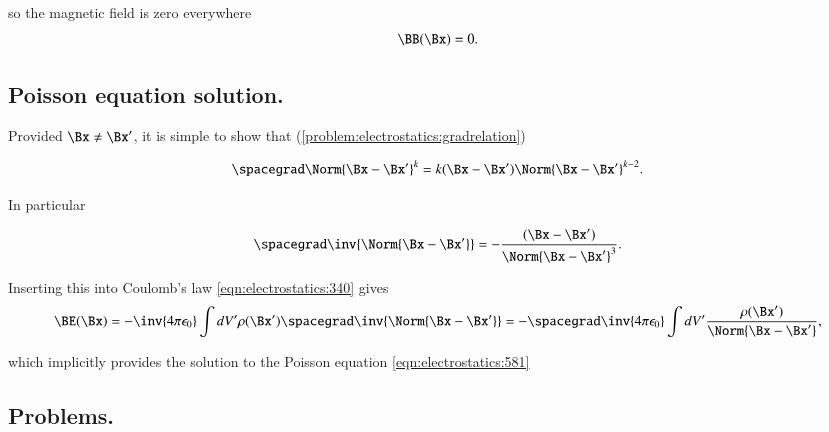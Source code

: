 so the magnetic field is zero everywhere
\begin{dmath}\label{eqn:electrostatics:320}
\BB(\Bx) = 0.
\end{dmath}


\subsection{Poisson equation solution.}

Provided \( \Bx \ne \Bx' \), it is simple to show that (\cref{problem:electrostatics:gradrelation})

\begin{dmath}\label{eqn:electrostatics:541}
\spacegrad \Norm{\Bx - \Bx'}^k = k (\Bx - \Bx') \Norm{ \Bx - \Bx' }^{k-2}.
\end{dmath}

In particular

\begin{dmath}\label{eqn:electrostatics:541}
\spacegrad \inv{\Norm{\Bx - \Bx'}} = - \frac{(\Bx - \Bx')}{\Norm{ \Bx - \Bx' }^{3}}.
\end{dmath}

Inserting this into Coulomb's law \cref{eqn:electrostatics:340} gives
\begin{dmath}\label{eqn:electrostatics:661}
\BE(\Bx)
=
-\inv{4 \pi \epsilon_0} \int dV' \rho(\Bx') \spacegrad \inv{\Norm{\Bx - \Bx'}}
=
- \spacegrad \inv{4 \pi \epsilon_0} \int dV' \frac{\rho(\Bx')}{\Norm{\Bx - \Bx'}},
\end{dmath}

which implicitly provides the solution to the Poisson equation \cref{eqn:electrostatics:581}


\subsection{Problems.}


